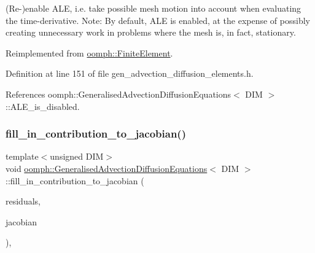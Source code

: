 (Re-\/)enable A\+LE, i.\+e. take possible mesh motion into account when evaluating the time-\/derivative. Note\+: By default, A\+LE is enabled, at the expense of possibly creating unnecessary work in problems where the mesh is, in fact, stationary. 



Reimplemented from \hyperlink{classoomph_1_1FiniteElement_a92ef8967fa4e2d6c33c51ea3efa3aa82}{oomph\+::\+Finite\+Element}.



Definition at line 151 of file gen\+\_\+advection\+\_\+diffusion\+\_\+elements.\+h.



References oomph\+::\+Generalised\+Advection\+Diffusion\+Equations$<$ D\+I\+M $>$\+::\+A\+L\+E\+\_\+is\+\_\+disabled.

\mbox{\label{classoomph_1_1GeneralisedAdvectionDiffusionEquations_a02fc6950a91d90a60b44e9e7a5e1db3f}} 
\subsubsection{\texorpdfstring{fill\+\_\+in\+\_\+contribution\+\_\+to\+\_\+jacobian()}{fill\_in\_contribution\_to\_jacobian()}}
{\footnotesize\ttfamily template$<$unsigned D\+IM$>$ \\
void \hyperlink{classoomph_1_1GeneralisedAdvectionDiffusionEquations}{oomph\+::\+Generalised\+Advection\+Diffusion\+Equations}$<$ D\+IM $>$\+::fill\+\_\+in\+\_\+contribution\+\_\+to\+\_\+jacobian (\begin{DoxyParamCaption}\item[{\hyperlink{classoomph_1_1Vector}{Vector}$<$ double $>$ \&}]{residuals,  }\item[{\hyperlink{classoomph_1_1DenseMatrix}{Dense\+Matrix}$<$ double $>$ \&}]{jacobian }\end{DoxyParamCaption})\hspace{0.3cm}{\ttfamily [inline]}, {\ttfamily [virtual]}}



